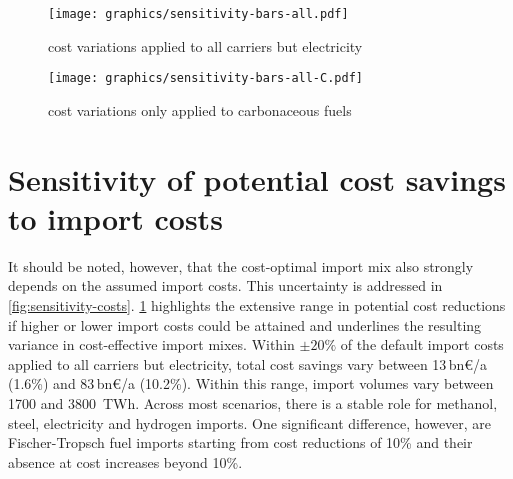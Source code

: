 \documentclass[5p,10pt]{elsarticle}
\newcommand{\bneuro}[1]{#1\,bn\euro{}/a}
\begin{document}
\begin{figure*}
    \begin{subfigure}[t]{\columnwidth}
        \caption{cost variations applied to all carriers but electricity}
        \label{fig:sensitivity-costs:A}
        \texttt{[image: graphics/sensitivity-bars-all.pdf]}
    \end{subfigure}
    \begin{subfigure}[t]{\columnwidth}
        \caption{cost variations only applied to carbonaceous fuels}
        \label{fig:sensitivity-costs:B}
        \texttt{[image: graphics/sensitivity-bars-all-C.pdf]}
    \end{subfigure}
    \caption{\textbf{Effect of import cost variations on cost savings and import shares with all vectors allowed.}
    In panel (a), indicated relative cost changes are applied uniformly to all
    vectors but electricity imports. In panel (b), cost changes are only applied
    to carbonaceous fuels (methane, methanol and Fischer-Tropsch). Top subpanels
    show potential cost savings compared to the scenario without imports. Bottom
    subpanels show the share and composition of different import vectors in
    relation to total energy system costs. The information is shown both in
    absolute terms and relative terms compared to the scenario without imports.
    }
    \label{fig:sensitivity-costs}
\end{figure*}

\section*{Sensitivity of potential cost savings to import costs}

It should be noted, however, that the cost-optimal import mix also strongly
depends on the assumed import costs. This uncertainty is addressed in
\cref{fig:sensitivity-costs}. \cref{fig:sensitivity-costs:A} highlights the
extensive range in potential cost reductions if higher or lower import costs
could be attained and underlines the resulting variance in cost-effective import
mixes. Within $\pm 20\%$ of the default import costs applied to all carriers but
electricity, total cost savings vary between \bneuro{13} (1.6\%) and \bneuro{83}
(10.2\%). Within this range, import volumes vary between 1700 and 3800~TWh.
Across most scenarios, there is a stable role for methanol, steel, electricity
and hydrogen imports. One significant difference, however, are Fischer-Tropsch
fuel imports starting from cost reductions of 10\% and their absence at cost
increases beyond 10\%.
\end{document}
